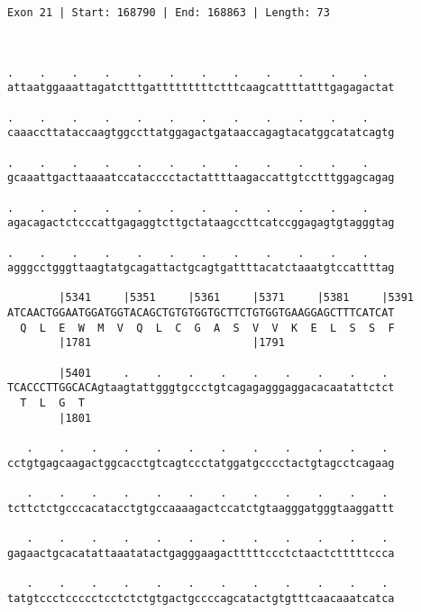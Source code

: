 \documentclass{article}
\begin{document}
\begin{Verbatim}
Exon 21 | Start: 168790 | End: 168863 | Length: 73



.    .    .    .    .    .    .    .    .    .    .    .    
attaatggaaattagatctttgatttttttttctttcaagcattttatttgagagactat
                                                            
.    .    .    .    .    .    .    .    .    .    .    .    
caaaccttataccaagtggccttatggagactgataaccagagtacatggcatatcagtg
                                                            
.    .    .    .    .    .    .    .    .    .    .    .    
gcaaattgacttaaaatccatacccctactattttaagaccattgtcctttggagcagag
                                                            
.    .    .    .    .    .    .    .    .    .    .    .    
agacagactctcccattgagaggtcttgctataagccttcatccggagagtgtagggtag
                                                            
.    .    .    .    .    .    .    .    .    .    .    .    
agggcctgggttaagtatgcagattactgcagtgattttacatctaaatgtccattttag
                                                            
        |5341     |5351     |5361     |5371     |5381     |5391
ATCAACTGGAATGGATGGTACAGCTGTGTGGTGCTTCTGTGGTGAAGGAGCTTTCATCAT
  Q  L  E  W  M  V  Q  L  C  G  A  S  V  V  K  E  L  S  S  F
        |1781                         |1791                 
  
        |5401     .    .    .    .    .    .    .    .    . 
TCACCCTTGGCACAgtaagtattgggtgccctgtcagagagggaggacacaatattctct
  T  L  G  T                                                
        |1801                                               
  
   .    .    .    .    .    .    .    .    .    .    .    . 
cctgtgagcaagactggcacctgtcagtccctatggatgcccctactgtagcctcagaag
                                                            
   .    .    .    .    .    .    .    .    .    .    .    . 
tcttctctgcccacatacctgtgccaaaagactccatctgtaagggatgggtaaggattt
                                                            
   .    .    .    .    .    .    .    .    .    .    .    . 
gagaactgcacatattaaatatactgagggaagactttttccctctaactctttttccca
                                                            
   .    .    .    .    .    .    .    .    .    .    .    . 
tatgtccctccccctcctctctgtgactgccccagcatactgtgtttcaacaaatcatca
                                                            

\end{Verbatim}
\end{document}
